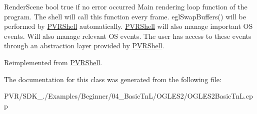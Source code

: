   Render\+Scene  bool true if no error occurred  Main rendering loop function of the program. The shell will call this function every frame. egl\+Swap\+Buffers() will be performed by \hyperlink{class_p_v_r_shell}{P\+V\+R\+Shell} automatically. \hyperlink{class_p_v_r_shell}{P\+V\+R\+Shell} will also manage important O\+S events. Will also manage relevant O\+S events. The user has access to these events through an abstraction layer provided by \hyperlink{class_p_v_r_shell}{P\+V\+R\+Shell}. 

Reimplemented from \hyperlink{class_p_v_r_shell_ae0eb5f797cbe993a22b8659f9c332578}{P\+V\+R\+Shell}.



The documentation for this class was generated from the following file\+:\begin{DoxyCompactItemize}
\item 
P\+V\+R/\+S\+D\+K\+\_./\+Examples/\+Beginner/04\+\_\+\+Basic\+Tn\+L/\+O\+G\+L\+E\+S2/O\+G\+L\+E\+S2\+Basic\+Tn\+L.\+cpp\end{DoxyCompactItemize}
